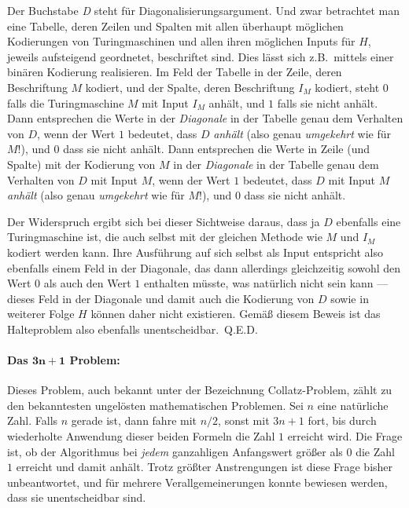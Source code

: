 Der Buchstabe \emph{D} steht für Diagonalisierungsargument. Und zwar betrachtet man eine Tabelle, deren Zeilen und Spalten mit allen überhaupt möglichen Kodierungen von Turingmaschinen und allen ihren möglichen Inputs für $H$, je\-weils aufsteigend geordnetet, beschriftet sind. Dies lässt sich z.B.\ mittels einer binären Kodierung realisieren. Im Feld der Tabelle in der Zeile, deren Beschriftung $M$ kodiert, und der Spalte, deren Beschriftung $I_M$ kodiert, steht $0$ falls die Turingmaschine $M$ mit Input $I_M$ anhält, und $1$ falls sie nicht anhält. Dann entsprechen die Werte in der \emph{Diagonale} in der Tabelle genau dem Verhalten von $D$, wenn der Wert $1$ bedeutet, dass $D$ \emph{anhält} (also genau \emph{umgekehrt} wie für $M$!), und $0$ dass sie nicht anhält. Dann entsprechen die Werte in Zeile (und Spalte) mit der Kodierung von $M$ in der \emph{Diagonale} in der Tabelle genau dem Verhalten von $D$ mit Input $M$, wenn der Wert $1$ bedeutet, dass $D$ mit Input $M$ \emph{anhält} (also genau \emph{umgekehrt} wie für $M$!), und $0$ dass sie nicht anhält.

Der Widerspruch ergibt sich bei dieser Sichtweise daraus, dass ja $D$ ebenfalls eine Tu\-ringmaschine ist, die auch selbst mit der gleichen Methode wie $M$ und $I_M$ kodiert werden kann. Ihre Ausführung auf sich selbst als Input entspricht also ebenfalls einem Feld in der Diagonale, das dann allerdings gleichzeitig sowohl den Wert $0$ als auch den Wert $1$ enthalten müsste, was natürlich nicht sein kann --- dieses Feld in der Diagonale und damit auch die Kodierung von $D$ sowie in weiterer Folge $H$ können daher nicht existieren. Gemäß diesem Beweis ist das Halteproblem also ebenfalls unentscheidbar.~Q.E.D.

\paragraph{Das $\mathbf{3n+1}$ Problem:} Dieses Problem, auch bekannt unter der Bezeichnung Collatz-Problem, zählt zu den bekanntesten ungelösten mathematischen Problemen. Sei $n$ eine natürliche Zahl. Falls $n$ gerade ist, dann fahre mit $n/2$, sonst mit $3n+1$ fort, bis durch wiederholte Anwendung dieser beiden Formeln die Zahl $1$ erreicht wird. Die Frage ist, ob der Algorithmus bei \emph{jedem} ganzahligen Anfangswert größer als $0$ die Zahl $1$ erreicht und damit anhält. Trotz größter Anstrengungen ist diese Frage bisher unbeantwortet, und für mehrere Verallgemeinerungen konnte bewiesen werden, dass sie unentscheidbar sind.

